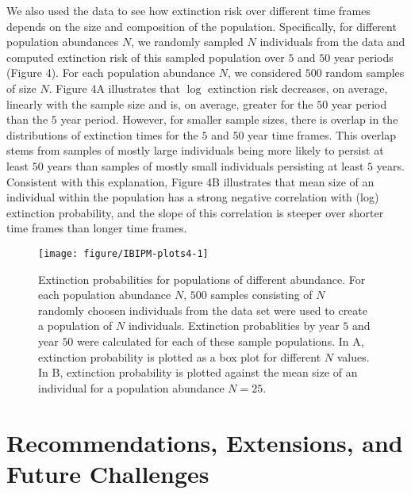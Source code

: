 \documentclass[12pt]{amsart}\usepackage[]{graphicx}\usepackage[]{color}
\makeatletter
\def\maxwidth{ %
  \ifdim\Gin@nat@width>\linewidth
    \linewidth
  \else
    \Gin@nat@width
  \fi
}
\newenvironment{knitrout}{}{} %
\makeatother
\begin{document}
We also used the data to see how extinction risk over different time frames depends on the size and composition of the population. Specifically, for different population abundances $N$, we randomly sampled $N$ individuals from the data and computed extinction risk of this sampled population over $5$ and $50$ year periods (Figure 4). For each population abundance $N$, we considered $500$ random samples of size $N$. Figure 4A illustrates that $\log$ extinction risk decreases, on average, linearly with the sample size and is, on average, greater for the $50$ year period than the $5$ year period. However, for smaller sample sizes, there is overlap in the distributions of extinction times for the $5$ and $50$ year time frames. This overlap stems from  samples of mostly large individuals being more likely to persist at least $50$ years than samples of mostly small individuals persisting at least $5$ years. Consistent with this explanation, Figure 4B illustrates that mean size of an individual within the population has a strong negative correlation with (log) extinction probability, and the slope of this correlation is steeper over shorter time frames than longer time frames.

\begin{knitrout}
\color{fgcolor}\begin{figure}
\texttt{[image: figure/IBIPM-plots4-1]} \caption[Extinction probabilities for populations of different abundance]{Extinction probabilities for populations of different abundance. For each population abundance $N$, $500$ samples consisting of $N$ randomly choosen individuals from the data set were used to create a population of $N$ individuals. Extinction probablities by year $5$ and year $50$ were calculated for each of these sample populations. In A, extinction probability is plotted as a box plot for different $N$ values. In B, extinction probability is plotted against the mean size of an individual for a population abundance $N=25$.}\label{fig:IBIPM-plots4}
\end{figure}


\end{knitrout}

\section*{Recommendations, Extensions, and Future Challenges}
\end{document}
